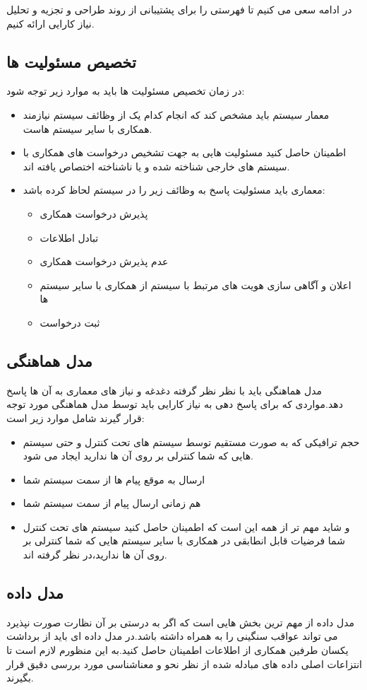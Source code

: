 در ادامه سعی می کنیم تا فهرستی را برای پشتیبانی از روند طراحی و تجزیه و تحلیل نیاز کارایی ارائه کنیم.


\subsection{تخصیص مسئولیت ها} 
در زمان تخصیص مسئولیت ها باید  به موارد زیر توجه شود:
\begin{itemize}
\item
معمار سیستم باید مشخص کند که انجام کدام یک از وظائف سیستم نیازمند همکاری با سایر سیستم هاست.
\item
اطمینان حاصل کنید مسئولیت هایی به جهت تشخیص درخواست های همکاری با سیستم های خارجی شناخته شده و یا ناشناخته اختصاص یافته اند.
\item
معماری باید مسئولیت پاسخ به وظائف زیر را در سیستم لحاظ کرده باشد:
\begin{itemize}
\item
پذیرش درخواست همکاری
\item
تبادل اطلاعات
\item
عدم پذیرش درخواست همکاری
\item
اعلان و آگاهی سازی هویت های مرتبط با سیستم از همکاری با سایر سیستم ها
\item
ثبت درخواست
\end{itemize}
\end{itemize}
\subsection{مدل هماهنگی}
مدل هماهنگی باید با نظر نظر گرفته دغدغه و نیاز های معماری به آن ها پاسخ دهد.مواردی که برای پاسخ دهی به نیاز کارایی باید توسط مدل هماهنگی مورد توجه قرار گیرند شامل موارد زیر است:
\begin{itemize}
\item
حجم ترافیکی که به صورت مستقیم توسط سیستم های تحت کنترل و حتی سیستم هایی که شما کنترلی بر روی آن ها ندارید ایجاد می شود.
\item
ارسال به موقع پیام ها از سمت سیستم شما
\item
هم زمانی ارسال پیام از سمت سیستم شما
\item
و شاید مهم تر از همه این است که اطمینان حاصل کنید سیستم های تحت کنترل شما فرضیات قابل انطابقی در همکاری با سایر سیستم هایی که شما کنترلی بر روی آن ها ندارید،‌در نظر گرفته اند.
\end{itemize}
\subsection{مدل داده}
مدل داده  از مهم ترین بخش هایی است که اگر به درستی بر آن نظارت صورت نپذیرد می تواند عواقب سنگینی را به همراه داشته باشد.در مدل داده ای باید از برداشت یکسان طرفین همکاری از اطلاعات اطمینان حاصل کنید.به این منظورم لازم است تا انتزاعات اصلی داده های مبادله شده از نظر نحو و معناشناسی مورد بررسی دقیق قرار بگیرند.
